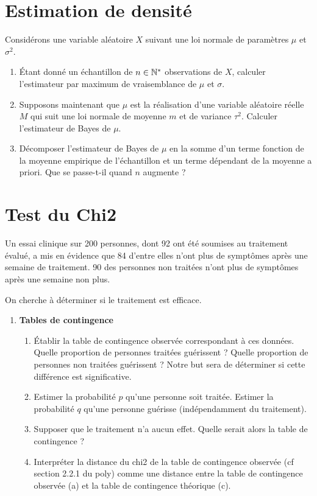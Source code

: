 \documentclass[french,11pt]{article}
\begin{document}
\section{Estimation de densité}
Considérons une variable aléatoire $X$ suivant une loi normale de paramètres
$\mu$ et $\sigma^2$.
\begin{enumerate}
\item Étant donné un échantillon de $n \in \mathbb{N}^*$ observations de $X$, calculer
  l'estimateur par maximum de vraisemblance de $\mu$ et $\sigma$.
\item Supposons maintenant que $\mu$ est la réalisation d'une variable
  aléatoire réelle $M$ qui suit une loi normale de moyenne $m$ et de variance
  $\tau^2$. Calculer l'estimateur de Bayes de $\mu$.
\item Décomposer l'estimateur de Bayes de $\mu$ en la somme d'un terme fonction
  de la moyenne empirique de l'échantillon et un terme dépendant de la moyenne
  a priori. Que se passe-t-il quand $n$ augmente ?
\end{enumerate}

\section{Test du Chi2}
Un essai clinique sur 200 personnes, dont 92 ont été soumises au traitement
évalué, a mis en évidence que 84 d'entre elles n'ont plus de symptômes après
une semaine de traitement. 90 des personnes non traitées n'ont plus de
symptômes après une semaine non plus.

On cherche à déterminer si le traitement est efficace.

\begin{enumerate}
\item \textbf{Tables de contingence}
  \begin{enumerate}
  \item Établir la table de contingence observée correspondant à ces
    données. Quelle proportion de personnes traitées guérissent ? Quelle
    proportion de personnes non traitées guérissent ? Notre but sera de
    déterminer si cette différence est significative.
  \item Estimer la probabilité $p$ qu'une personne soit traitée. Estimer la
    probabilité $q$ qu'une personne guérisse (indépendamment du traitement).
  \item Supposer que le traitement n'a aucun effet. Quelle serait alors la
    table de contingence ?
  \item Interpréter la distance du chi2 de la table de contingence observée (cf
    section 2.2.1 du poly) comme une distance entre la table de contingence
    observée (a) et la table de contingence théorique (c).
  \end{enumerate}
\end{enumerate}
\end{document}
